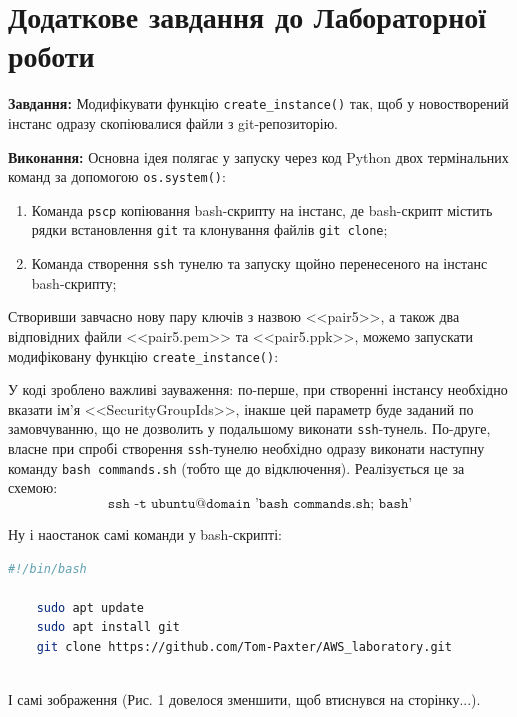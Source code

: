 \documentclass[a4paper,14pt]{extarticle} %
\begin{document}
\section*{Додаткове завдання до Лабораторної роботи }

\textbf{Завдання:} Модифікувати функцію \texttt{create\_instance()} так, щоб у новостворений інстанс одразу 
скопіювалися файли з git-репозиторію.

\textbf{Виконання:} Основна ідея полягає у запуску через код Python двох термінальних команд за допомогою 
\texttt{os.system()}:
\begin{enumerate}
    \item Команда \texttt{pscp} копіювання bash-скрипту на інстанс, де bash-скрипт містить рядки встановлення 
    \texttt{git} та клонування файлів \texttt{git clone};
    \item Команда створення \texttt{ssh} тунелю та запуску щойно перенесеного на інстанс bash-скрипту; 
\end{enumerate}

Створивши завчасно нову пару ключів з назвою <<pair5>>, а також два відповідних файли 
<<pair5.pem>> та <<pair5.ppk>>, можемо запускати модифіковану функцію \texttt{create\_instance()}:



У коді зроблено важливі зауваження: по-перше, при створенні інстансу необхідно вказати ім'я 
<<SecurityGroupIds>>, інакше цей параметр буде заданий по замовчуванню, що не дозволить у подальшому виконати 
\texttt{ssh}-тунель. По-друге, власне при спробі створення \texttt{ssh}-тунелю необхідно одразу виконати наступну 
команду \texttt{bash commands.sh} (тобто ще до відключення). Реалізується це за схемою:
\[ \texttt{ssh -t ubuntu@domain 'bash commands.sh; bash'} \]

Ну і наостанок самі команди у bash-скрипті:

\begin{lstlisting}[language=bash, stringstyle=\small\ttfamily, emphstyle={[1]\small\ttfamily}]
    #!/bin/bash

    sudo apt update
    sudo apt install git
    git clone https://github.com/Tom-Paxter/AWS_laboratory.git
    
\end{lstlisting}

І самі зображення (Рис. 1 довелося зменшити, щоб втиснувся на сторінку...).
\end{document}
